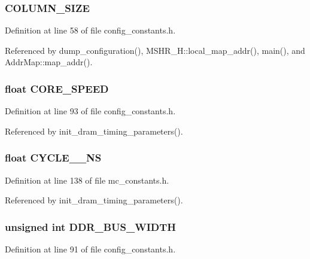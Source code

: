 \subsubsection[{COLUMN\_\-SIZE}]{ {\bf COLUMN\_\-SIZE}}\label{mc__constants_8h_f0596ae8862443e137eb225092bffad6}




Definition at line 58 of file config\_\-constants.h.

Referenced by dump\_\-configuration(), MSHR\_\-H::local\_\-map\_\-addr(), main(), and AddrMap::map\_\-addr().
\subsubsection[{CORE\_\-SPEED}]{\setlength{\rightskip}{0pt plus 5cm}float {\bf CORE\_\-SPEED}}\label{mc__constants_8h_caed83499d078ca4534df759dc75445c}




Definition at line 93 of file config\_\-constants.h.

Referenced by init\_\-dram\_\-timing\_\-parameters().
\subsubsection[{CYCLE\_\-2\_\-NS}]{\setlength{\rightskip}{0pt plus 5cm}float {\bf CYCLE\_\_\-NS}}\label{mc__constants_8h_95a920a6fa24ef6369f937f9df4e23c8}




Definition at line 138 of file mc\_\-constants.h.

Referenced by init\_\-dram\_\-timing\_\-parameters().
\subsubsection[{DDR\_\-BUS\_\-WIDTH}]{\setlength{\rightskip}{0pt plus 5cm}unsigned int {\bf DDR\_\-BUS\_\-WIDTH}}\label{mc__constants_8h_543d9f5a985d4d7992dd069643fec625}




Definition at line 91 of file config\_\-constants.h.

